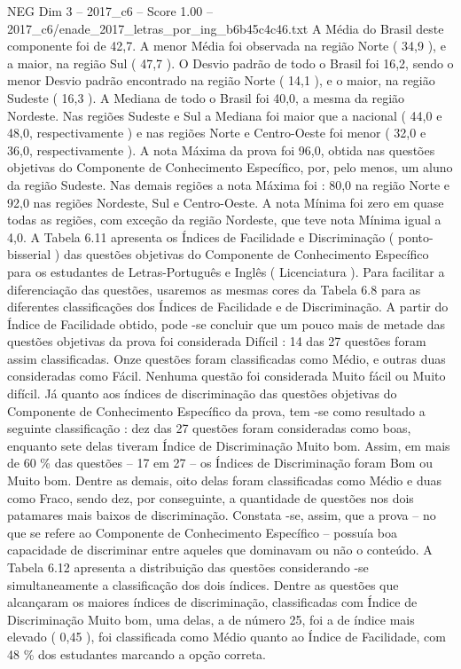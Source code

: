 \begin{textsample}{NEG Dim 3 – 2017\_c6 – Score 1.00 – 2017\_c6/enade\_2017\_letras\_por\_ing\_b6b45c4c46.txt}
A Média do Brasil deste componente foi de 42,7.
A menor Média foi observada na região Norte ( 34,9 ), e a maior, na região Sul ( 47,7 ).
O Desvio padrão de todo o Brasil foi 16,2, sendo o menor Desvio padrão encontrado na região Norte ( 14,1 ), e o maior, na região Sudeste ( 16,3 ).
A Mediana de todo o Brasil foi 40,0, a mesma da região Nordeste.
Nas regiões Sudeste e Sul a Mediana foi maior que a nacional ( 44,0 e 48,0, respectivamente ) e nas regiões Norte e Centro-Oeste foi menor ( 32,0 e 36,0, respectivamente ).
A nota Máxima da prova foi 96,0, obtida nas questões objetivas do Componente de Conhecimento Específico, por, pelo menos, um aluno da região Sudeste.
Nas demais regiões a nota Máxima foi : 80,0 na região Norte e 92,0 nas regiões Nordeste, Sul e Centro-Oeste.
A nota Mínima foi zero em quase todas as regiões, com exceção da região Nordeste, que teve nota Mínima igual a 4,0.
A Tabela 6.11 apresenta os Índices de Facilidade e Discriminação ( ponto-bisserial ) das questões objetivas do Componente de Conhecimento Específico para os estudantes de Letras-Português e Inglês ( Licenciatura ).
Para facilitar a diferenciação das questões, usaremos as mesmas cores da Tabela 6.8 para as diferentes classificações dos Índices de Facilidade e de Discriminação.
A partir do Índice de Facilidade obtido, pode -se concluir que um pouco mais de metade das questões objetivas da prova foi considerada Difícil : 14 das 27 questões foram assim classificadas.
Onze questões foram classificadas como Médio, e outras duas consideradas como Fácil.
Nenhuma questão foi considerada Muito fácil ou Muito difícil.
Já quanto aos índices de discriminação das questões objetivas do Componente de Conhecimento Específico da prova, tem -se como resultado a seguinte classificação : dez das 27 questões foram consideradas como boas, enquanto sete delas tiveram Índice de Discriminação Muito bom.
Assim, em mais de 60 \% das questões – 17 em 27 – os Índices de Discriminação foram Bom ou Muito bom.
Dentre as demais, oito delas foram classificadas como Médio e duas como Fraco, sendo dez, por conseguinte, a quantidade de questões nos dois patamares mais baixos de discriminação.
Constata -se, assim, que a prova – no que se refere ao Componente de Conhecimento Específico – possuía boa capacidade de discriminar entre aqueles que dominavam ou não o conteúdo.
A Tabela 6.12 apresenta a distribuição das questões considerando -se simultaneamente a classificação dos dois índices.
Dentre as questões que alcançaram os maiores índices de discriminação, classificadas com Índice de Discriminação Muito bom, uma delas, a de número 25, foi a de índice mais elevado ( 0,45 ), foi classificada como Médio quanto ao Índice de Facilidade, com 48 \% dos estudantes marcando a opção correta.

\end{textsample}
